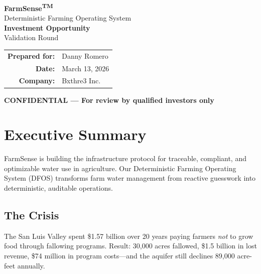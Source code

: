\documentclass[10pt]{article}
\begin{document}
\thispagestyle{empty}
\begin{center}
\vspace*{2in}

{\Huge\bfseries\color{farmsense-green} FarmSense\textsuperscript{TM}}\\[0.3in]
{\Large\color{farmsense-gray} Deterministic Farming Operating System}\\[1in]

{\LARGE\bfseries Investment Opportunity}\\[0.2in]
{\Large Validation Round}\\[1.5in]

\begin{tabular}{rl}
\textbf{Prepared for:} & Danny Romero \\[0.1in]
\textbf{Date:} & March 13, 2026 \\[0.1in]
\textbf{Company:} & Bxthre3 Inc. \\
\end{tabular}

\vfill

{\small\color{farmsense-gold}\textbf{CONFIDENTIAL — For review by qualified investors only}}

\end{center}

\newpage

\tableofcontents
\newpage

\section{Executive Summary}

FarmSense is building the infrastructure protocol for traceable, compliant, and optimizable water use in agriculture. Our Deterministic Farming Operating System (DFOS) transforms farm water management from reactive guesswork into deterministic, auditable operations.

\subsection{The Crisis}
The San Luis Valley spent \$1.57 billion over 20 years paying farmers \textit{not} to grow food through fallowing programs. Result: 30,000 acres fallowed, \$1.5 billion in lost revenue, \$74 million in program costs—and the aquifer still declines 89,000 acre-feet annually.
\end{document}
